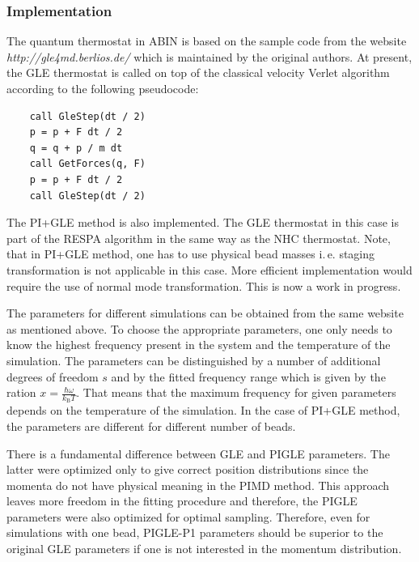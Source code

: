 \subsubsection{Implementation}
\label{sGLEimpl}
The quantum thermostat in \textsc{ABIN} is based on the sample code from the website \textit{http://gle4md.berlios.de/} which is maintained by the original authors.
At present, the GLE thermostat is called on top of the classical velocity Verlet algorithm according to the following pseudocode:

\bigskip
\begin{verbatim}
    call GleStep(dt / 2)
    p = p + F dt / 2
    q = q + p / m dt
    call GetForces(q, F) 
    p = p + F dt / 2
    call GleStep(dt / 2)
\end{verbatim}
\bigskip

The PI+GLE method is also implemented. The GLE thermostat in this case is part of the RESPA algorithm in the same way as the NHC thermostat. Note, that in PI+GLE method, one has to use physical bead masses i.\,e. staging transformation is not applicable in this case\cite{Ceriotti2012}. More efficient implementation would require the use of normal mode transformation. This is now a work in progress.

The parameters for different simulations can be obtained from the same website as mentioned above. To choose the appropriate parameters, one only needs to know the highest frequency present in the system and the temperature of the simulation. The parameters can be distinguished by a number of additional degrees of freedom $s$ and by the fitted frequency range which is given by the ration $x=\frac{\hbar\omega}{k_\mathrm{B}T}$. That means that the maximum frequency for given parameters depends on the temperature of the simulation. In the case of PI+GLE method, the parameters are different for different number of beads.

There is a fundamental difference between GLE and PIGLE parameters. The latter were optimized only to give correct position distributions since the momenta do not have physical meaning in the PIMD method. This approach leaves more freedom in the fitting procedure and therefore, the PIGLE parameters were also optimized for optimal sampling. Therefore, even for simulations with one bead, PIGLE-P1 parameters should be superior to the original GLE parameters if one is not interested in the momentum distribution. 


\newpage
